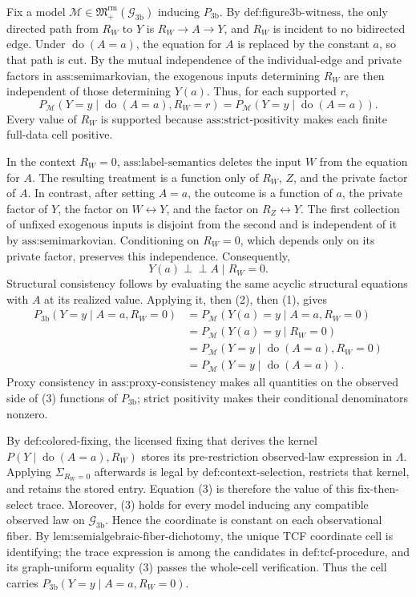 Fix a model \(\mathcal M\in\mathfrak M_{+}^{\mathrm{rm}}(\mathcal G_{\mathrm{3b}})\) inducing \(P_{\mathrm{3b}}\).  By \(\text{def:figure3b-witness}\), the only directed path from \(R_W\) to \(Y\) is \(R_W\to A\to Y\), and \(R_W\) is incident to no bidirected edge.  Under \(\operatorname{do}(A=a)\), the equation for \(A\) is replaced by the constant \(a\), so that path is cut.  By the mutual independence of the individual-edge and private factors in \(\text{ass:semimarkovian}\), the exogenous inputs determining \(R_W\) are then independent of those determining \(Y(a)\).  Thus, for each supported \(r\),
\[
P_{\mathcal M}(Y=y\mid\operatorname{do}(A=a),R_W=r)
=P_{\mathcal M}(Y=y\mid\operatorname{do}(A=a)).
\tag{1}
\]
Every value of \(R_W\) is supported because \(\text{ass:strict-positivity}\) makes each finite full-data cell positive.

In the context \(R_W=0\), \(\text{ass:label-semantics}\) deletes the input \(W\) from the equation for \(A\).  The resulting treatment is a function only of \(R_W\), \(Z\), and the private factor of \(A\).  In contrast, after setting \(A=a\), the outcome is a function of \(a\), the private factor of \(Y\), the factor on \(W\leftrightarrow Y\), and the factor on \(R_Z\leftrightarrow Y\).  The first collection of unfixed exogenous inputs is disjoint from the second and is independent of it by \(\text{ass:semimarkovian}\).  Conditioning on \(R_W=0\), which depends only on its private factor, preserves this independence.  Consequently,
\[
Y(a)\mathbin{\perp\!\!\!\perp}A\mid R_W=0.
\tag{2}
\]
Structural consistency follows by evaluating the same acyclic structural equations with \(A\) at its realized value.  Applying it, then (2), then (1), gives
\[
\begin{aligned}
P_{\mathrm{3b}}(Y=y\mid A=a,R_W=0)
&=P_{\mathcal M}(Y(a)=y\mid A=a,R_W=0)\\
&=P_{\mathcal M}(Y(a)=y\mid R_W=0)\\
&=P_{\mathcal M}(Y=y\mid\operatorname{do}(A=a),R_W=0)\\
&=P_{\mathcal M}(Y=y\mid\operatorname{do}(A=a)).
\end{aligned}
\tag{3}
\]
Proxy consistency in \(\text{ass:proxy-consistency}\) makes all quantities on the observed side of (3) functions of \(P_{\mathrm{3b}}\); strict positivity makes their conditional denominators nonzero.

By \(\text{def:colored-fixing}\), the licensed fixing that derives the kernel \(P(Y\mid\operatorname{do}(A=a),R_W)\) stores its pre-restriction observed-law expression in \(\Lambda\).  Applying \(\Sigma_{R_W=0}\) afterwards is legal by \(\text{def:context-selection}\), restricts that kernel, and retains the stored entry.  Equation (3) is therefore the value of this fix-then-select trace.  Moreover, (3) holds for every model inducing any compatible observed law on \(\mathcal G_{\mathrm{3b}}\).  Hence the coordinate is constant on each observational fiber.  By \(\text{lem:semialgebraic-fiber-dichotomy}\), the unique TCF coordinate cell is identifying; the trace expression is among the candidates in \(\text{def:tcf-procedure}\), and its graph-uniform equality (3) passes the whole-cell verification.  Thus the cell carries \(P_{\mathrm{3b}}(Y=y\mid A=a,R_W=0)\).

